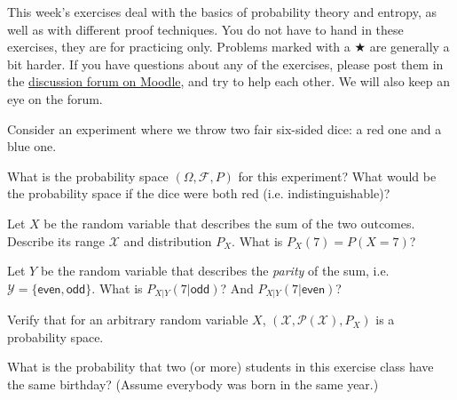 \documentclass[a4paper,10pt,landscape,twocolumn]{scrartcl}
\newcommand\deadline{na}
\begin{document}
\practiceproblems

{\sffamily\noindent
This week's exercises deal with the basics of probability theory and entropy, as well as with different proof techniques. You do not have to hand in these exercises, they are for practicing only. Problems marked with a $\bigstar$ are generally a bit harder. If you have questions about any of the exercises, please post them in the \href{https://www.moodle.ch/lms/mod/forum/view.php?id=2219}{discussion forum on Moodle}, and try to help each other. We will also keep an eye on the forum.
}

\enlargethispage{1cm}
\begin{exercise}
Consider an experiment where we throw two fair six-sided dice: a red one and a blue one.
	\begin{subex}
	What is the probability space $(\Omega,\mathcal{F},P)$ for this experiment? What would be the probability space if the dice were both red (i.e. indistinguishable)?
	\end{subex}
	\begin{subex}
	Let $X$ be the random variable that describes the sum of the two outcomes. Describe its range $\mathcal{X}$ and distribution $P_X$. What is $P_X(7) = P(X=7)$?
	\end{subex}
	\begin{subex}
	Let $Y$ be the random variable that describes the \emph{parity} of the sum, i.e. $\mathcal{Y} = \{\mathsf{even}, \mathsf{odd}\}$. What is $P_{X|Y}(7|\mathsf{odd})$? And $P_{X|Y}(7|\mathsf{even})$?
	\end{subex}
	\begin{subex}
	Verify that for an arbitrary random variable $X$, $(\mathcal{X},\mathcal{P}(\mathcal{X}),P_X)$ is a probability space.
	\end{subex}
\end{exercise}

\begin{exercise}
What is the probability that two (or more) students in this exercise class have the same birthday? (Assume everybody was born in the same year.)
\end{exercise}
\end{document}
